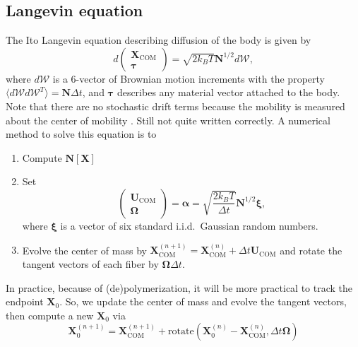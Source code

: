 \documentclass[11pt]{article}
\newcommand{\red}[1]{\color{red}#1\normalcolor}
\newcommand{\V}[1]{\boldsymbol{#1}}                 %
\newcommand{\M}[1]{\boldsymbol{#1}}
\newcommand{\Lop}[1]{\boldsymbol{\mathcal{#1}}}
\begin{document}
\subsection{Langevin equation}
The Ito Langevin equation describing diffusion of the body is given by \cite{makino2004brownian}
\begin{equation}
d\begin{pmatrix}\V{X}_\text{COM} \\ \V{\tau} \end{pmatrix}
 = \sqrt{2 k_B T} \M{N}^{1/2} d\Lop{W},
\end{equation}
where $d\Lop{W}$ is a 6-vector of Brownian motion increments with the property $\langle d\Lop{W} d\Lop{W}^T \rangle = \M{N}\Delta t$, and $\V{\tau}$ describes any material vector attached to the body. Note that there are no stochastic drift terms because the mobility is measured about the center of mobility \cite{makino2004brownian}. \red{Still not quite written correctly.} A numerical method to solve this equation is to \cite{delong2015brownian}
\begin{enumerate}
\item Compute $\M{N}\left[\V{X}\right]$
\item Set $$\begin{pmatrix} \V{U}_\text{COM} \\ \V{\Omega} \end{pmatrix} = \V{\alpha} =\sqrt{\frac{2 k_B T}{\Delta t}} \M{N}^{1/2}\V{\xi},$$
where $\V{\xi}$ is a vector of six standard i.i.d.\ Gaussian random numbers.
\item Evolve the center of mass by $\V{X}_\text{COM}^{(n+1)}=\V{X}_\text{COM}^{(n)}+\Delta t \V{U}_\text{COM}$ and rotate the tangent vectors of each fiber by $\V{\Omega} \Delta t$.
\end{enumerate}
In practice, because of (de)polymerization, it will be more practical to track the endpoint $\V{X}_0$. So, we update the center of mass and evolve the tangent vectors, then compute a new $\V{X}_0$ via 
$$\V{X}_0^{(n+1)}=\V{X}_\text{COM}^{(n+1)}+\text{rotate}\left(\V{X}_0^{(n)}-\V{X}_\text{COM}^{(n)},\Delta t \V{\Omega}\right)$$
\end{document}
